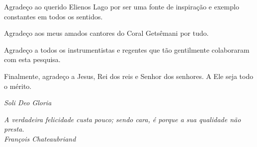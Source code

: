 \documentclass[a4paper, 12pt, openright, oneside, german, french, english, brazil]{abntex2}
\begin{document}
\begin{agradecimentos}
          Agradeço ao querido Elienos Lago por ser uma fonte de inspiração e exemplo constantes em todos os sentidos.

          Agradeço aos meus amados cantores do Coral Getsêmani por tudo.

          Agradeço a todos os instrumentistas e regentes que tão gentilmente colaboraram com esta pesquisa.

          Finalmente, agradeço a Jesus, Rei dos reis e Senhor dos senhores. A Ele seja todo o mérito.

          \begin{center}
            \textit{Soli Deo Gloria}
          \end{center}
          
	\end{agradecimentos}

	\begin{epigrafe}
		\vspace*{\fill}
		\begin{flushright}
			\textit{A verdadeira felicidade custa pouco; sendo cara, é porque a sua qualidade não presta.\\
				François Chateaubriand}
		\end{flushright}
	\end{epigrafe}
\end{document}
